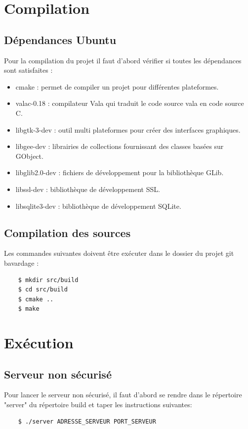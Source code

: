 \documentclass[a4paper,11pt,french]{book}
\begin{document}
\section{Compilation}
\subsection{Dépendances Ubuntu}
Pour la compilation du projet il faut d'abord vérifier si toutes les dépendances sont satisfaites :
\begin{itemize}
\item cmake : permet de compiler un projet pour différentes plateformes.
\item valac-0.18 : compilateur Vala qui traduit le code source vala en code source C.
\item libgtk-3-dev : outil multi plateformes pour créer des interfaces graphiques.
\item libgee-dev : librairies de collections fournissant des classes basées sur GObject.
\item libglib2.0-dev : fichiers de développement pour la bibliothèque GLib.
\item libssl-dev : bibliothèque de développement SSL.
\item libsqlite3-dev : bibliothèque de développement SQLite.

\end{itemize}

\subsection{Compilation des sources}

Les commandes suivantes doivent être exécuter dans le dossier du projet git bavardage : 
\begin{verbatim}
    $ mkdir src/build 
    $ cd src/build 
    $ cmake .. 
    $ make
\end{verbatim}

\section{Exécution}
\subsection{Serveur non sécurisé}
Pour lancer le serveur non sécurisé, il faut d'abord se rendre dans le répertoire "server" du répertoire build et taper les instructions suivantes:

\begin{verbatim}
    $ ./server ADRESSE_SERVEUR PORT_SERVEUR
\end{verbatim}
\end{document}
